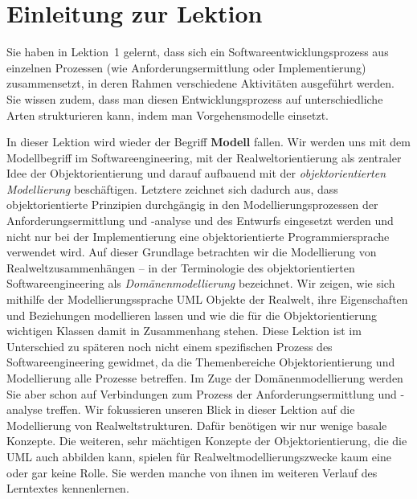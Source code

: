 \cleardoublepage
\chapter*{Einleitung zur Lektion}

Sie haben in Lektion~1 %
gelernt, 
dass sich ein Softwareentwicklungsprozess aus einzelnen Prozessen (wie Anforderungsermittlung oder Implementierung) zusammensetzt, in deren Rahmen verschiedene Aktivitäten ausgeführt werden. Sie wissen zudem, dass man diesen Entwicklungsprozess auf unterschiedliche Arten strukturieren kann, indem man Vorgehensmodelle einsetzt.
 
In  dieser Lektion 
wird wieder der Begriff \textbf{Modell} fallen. Wir werden uns mit dem Modellbegriff im Softwareengineering, mit der Realweltorientierung als zentraler Idee der Objektorientierung und darauf aufbauend mit der \textit{objektorientierten Modellierung} beschäftigen. Letztere zeichnet sich dadurch aus, dass objektorientierte Prinzipien durchgängig in den Modellierungsprozessen der Anforderungsermittlung und -analyse und des Entwurfs eingesetzt werden und nicht nur bei der Implementierung eine objektorientierte Programmiersprache verwendet wird. Auf dieser Grundlage betrachten wir die Modellierung von Realweltzusammenhängen – in der Terminologie des objektorientierten Softwareengineering als \textit{Domänenmodellierung} bezeichnet. Wir zeigen, wie sich mithilfe der Modellierungssprache UML Objekte der Realwelt, ihre Eigenschaften und Beziehungen modellieren lassen und wie die für die Objekt\-orientierung wichtigen Klassen damit in Zusammenhang stehen. Diese Lektion ist im Unterschied zu späteren noch nicht einem spezifischen Prozess des Software\-engineering gewidmet, da die Themenbereiche Objektorientierung und Modellierung alle Prozesse betreffen. Im Zuge der Domänenmodellierung werden Sie aber schon auf Verbindungen zum Prozess der Anforderungsermittlung und -analyse treffen. Wir fokussieren unseren Blick in dieser Lektion auf die Modellierung von Realweltstrukturen. Dafür benötigen wir nur wenige basale Konzepte. Die weiteren, sehr mächtigen Konzepte der Objektorientierung, die die UML auch abbilden kann, spielen für Realweltmodellierungszwecke kaum eine oder gar keine Rolle. Sie werden manche von ihnen im weiteren Verlauf des Lerntextes kennenlernen.

